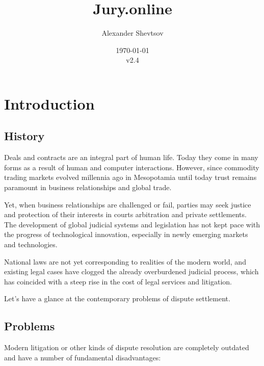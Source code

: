 \documentclass[12pt]{article}
\title{Jury.online}
\author{Alexander Shevtsov}
\date{\today\\v2.4}
\begin{document}
\maketitle
\tableofcontents 
\section{Introduction}
\subsection{History}
Deals and contracts are an integral part of human life. Today they come in many forms as a result of human and computer interactions.
However, since commodity trading markets evolved millennia ago in Mesopotamia until today trust remains paramount in business relationships
and global trade.

Yet, when business relationships are challenged or fail, parties may seek justice and  protection of their interests in courts arbitration
and private settlements. The development of global judicial systems and legislation has not kept pace with the progress of technological
innovation, especially in newly emerging markets and technologies. 

National laws are not yet corresponding to realities of the modern world, and existing legal cases have clogged the already overburdened
judicial process, which has coincided with a steep rise in the cost of legal services and litigation. 

Let’s have a glance at the contemporary problems of dispute settlement.

\subsection{Problems} Modern litigation or other kinds of dispute resolution are completely outdated and have a number of fundamental
disadvantages:
\end{document}
